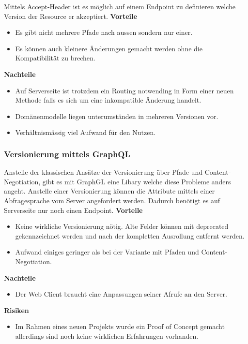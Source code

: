 Mittels Accept-Header ist es möglich auf einem Endpoint zu definieren welche Version der Resource er akzeptiert.
\newline
\newline
\textbf{Vorteile}
\begin{itemize}
	\item Es gibt nicht mehrere Pfade nach aussen sondern nur einer.
	\item Es können auch kleinere Änderungen gemacht werden ohne die Kompatibilität zu brechen.
\end{itemize}
\textbf{Nachteile}
\begin{itemize}
	\item Auf Serverseite ist trotzdem ein Routing notwending in Form einer neuen Methode falls es sich um eine inkompatible Änderung handelt.
	\item Domänenmodelle liegen unterumständen in mehreren Versionen vor.
	\item Verhältnismässig viel Aufwand für den Nutzen.
\end{itemize}

\subsubsection{Versionierung mittels GraphQL}

Anstelle der klassischen Ansätze der Versionierung über Pfade und Content-Negotiation, gibt es mit GraphGL eine Libary welche diese Probleme anders angeht. Anstelle einer Versionierung können die Attribute mittels einer Abfragesprache vom Server angefordert werden. Dadurch benötigt es auf Serverseite nur noch einen Endpoint.
\newline
\newline
\textbf{Vorteile}
\begin{itemize}
	\item Keine wirkliche Versionierung nötig. Alte Felder können mit deprecated gekennzeichnet werden und nach der kompletten Ausrollung entfernt werden.
	\item Aufwand einiges geringer als bei der Variante mit Pfaden und Content-Negotiation.
\end{itemize}
\textbf{Nachteile}
\begin{itemize}
	\item Der Web Client braucht eine Anpassungen seiner Afrufe an den Server.
\end{itemize}
\textbf{Risiken}
\begin{itemize}
	\item Im Rahmen eines neuen Projekts wurde ein Proof of Concept gemacht allerdings sind noch keine wirklichen Erfahrungen vorhanden.
\end{itemize}

